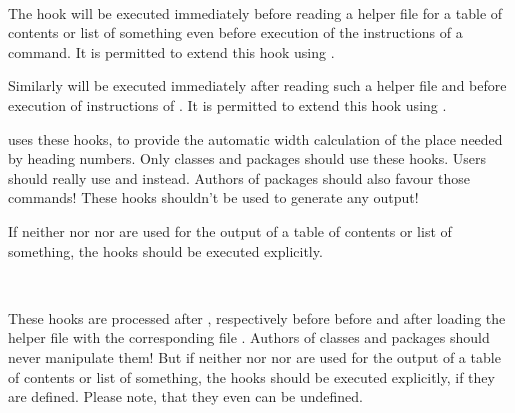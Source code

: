 \begin{Declaration}
  \\
\end{Declaration}
%
%
The hook  will be executed immediately before
reading a helper file for a table of contents or list of something even
before execution of the instructions of a 
command. It is permitted to extend this hook using
.

Similarly  will be executed immediately after
reading such a helper file and before execution of instructions of
. It is permitted to extend this hook using
.

\KOMAScript{} uses these hooks, to provide the automatic width calculation of
the place needed by heading numbers. Only classes and packages should use
these hooks. Users should really use
 and  instead. Authors of
packages should also favour those commands! These hooks shouldn't be used to
generate any output!

If neither  nor 
nor  are used for the output of a table of contents or list
of something, the hooks should be executed explicitly.%
%
%

\begin{Declaration}
  \\
\end{Declaration}
%
%
These hooks are processed after , respectively
before  before and after loading the helper file
with the corresponding file . Authors
of classes and packages should never manipulate them! But if
neither  nor  nor
 are used for the output of a table of contents or list of
something, the hooks should be executed explicitly, if they are
defined. Please note, that they even can be undefined.%
%
%

